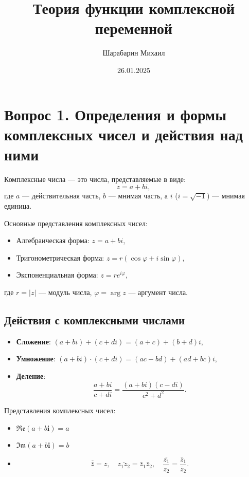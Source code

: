 \documentclass{article}
\title{Теория функции комплексной переменной}
\author{Шарабарин Михаил}
\date{26.01.2025}
\begin{document}
\maketitle
\tableofcontents
\newpage

\section{Вопрос 1. Определения и формы комплексных чисел и действия над ними}

Комплексные числа — это числа, представляемые в виде:
\[
    z = a + bi,
\]
где \(a\) — действительная часть, \(b\) — мнимая часть,
а \(i\) (\(i = \sqrt{-1}\)) — мнимая единица.

Основные представления комплексных чисел:
\begin{itemize}
    \item Алгебраическая форма: \(z = a + bi\),
    \item Тригонометрическая форма: \(z = r (\cos \varphi + i \sin \varphi)\),
    \item Экспоненциальная форма: \(z = r e^{i\varphi}\),
\end{itemize}
где \(r = |z|\) — модуль числа, \(\varphi = \arg z\) — аргумент числа.

\subsection{Действия с комплексными числами}
\begin{itemize}
    \item {\bfseries Сложение}: \((a + bi) + (c + di) = (a + c) + (b + d)i\),
    \item {\bfseries Умножение}: \((a + bi) \cdot (c + di) = (ac - bd) + (ad + bc)i\),
    \item {\bfseries Деление}:
          \[
              \frac{a + bi}{c + di} = \frac{(a + bi)(c - di)}{c^2 + d^2}.
          \]
\end{itemize}

Представления комплексных чисел:
\begin{itemize}
    \item \(\mathfrak{Re}(a + b\mathbf{i}) = a\)
    \item \(\mathfrak{Im}(a + b\mathbf{i}) = b\)
    \item \begin{equation*}
              \overline{\bar{z}}=z,
              \quad \overline{z_1z_2}=\bar{z}_1\bar{z}_2,
              \quad \overline{\frac{z_1}{z_2}}=\frac{\bar{z}_1}{\bar{z}_2}.
          \end{equation*}
\end{itemize}
\end{document}
